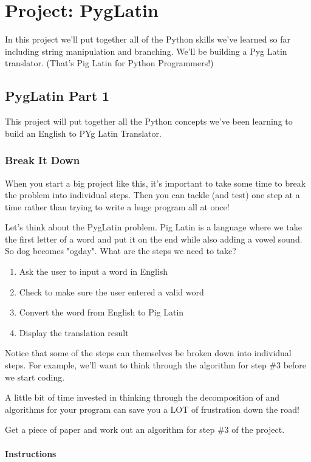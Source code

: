 \documentclass[12pt,a4paper,final,twoside,onecolumn,titlepage]{book}
\begin{document}
\chapter{Project: PygLatin}
In this project we'll put together all of the Python skills we've learned so far including string manipulation and branching. We'll be building a Pyg Latin translator. (That's Pig Latin for Python Programmers!)

\section{PygLatin Part 1}
This project will put together all the Python concepts we've been learning to build an English to PYg Latin Translator.

\subsection{Break It Down}

When you start a big project like this, it's important to take some time to break the problem into individual steps. Then you can tackle (and test) one step at a time rather than trying to write a huge program all at once!

Let's think about the PygLatin problem. Pig Latin is a language where we take the first letter of a word and put it on the end while also adding a vowel sound. So dog becomes "ogday". What are the steps we need to take?
\begin{enumerate}
\item    Ask the user to input a word in English
\item    Check to make sure the user entered a valid word
\item    Convert the word from English to Pig Latin
\item    Display the translation result
\end{enumerate}

Notice that some of the steps can themselves be broken down into individual steps. For example, we'll want to think through the algorithm for step \#3 before we start coding.

A little bit of time invested in thinking through the decomposition of and algorithms for your program can save you a LOT of frustration down the road!

Get a piece of paper and work out an algorithm for step \#3 of the project.

\subsubsection{Instructions}
\end{document}
